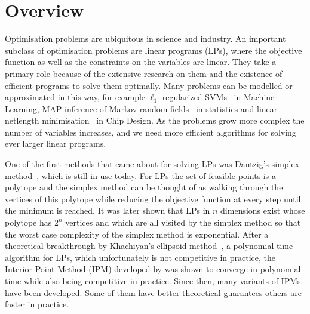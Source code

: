 \chapter{Overview}\label{chap:introduction}

Optimisation problems are ubiquitous in science and industry.
An important subclass of optimisation problems are linear programs (LPs), where the objective function as well as the constraints on the variables are linear.
They take a primary role because of the extensive research on them and the existence of efficient programs to solve them optimally.
Many problems can be modelled or approximated in this way, for example \(\ell_1\)-regularized SVMs~\cite{ZhuRossetTibshiraniHastie-1normSupportVectorMachines} in Machine Learning, MAP inference of Markov random fields~\cite{MeshiGloberson-MapLpRelaxation} in statistics and linear netlength minimisation~\cite{BrennerVygen-AnalyticalMethodsInVlsiPlacement} in Chip Design.
As the problems grow more complex the number of variables increases, and we need more efficient algorithms for solving ever larger linear programs.

One of the first methods that came about for solving LPs was Dantzig's simplex method~\cite{Dantzig-Simplex}, which is still in use today.
For LPs the set of feasible points is a polytope and the simplex method can be thought of as walking through the vertices of this polytope while reducing the objective function at every step until the minimum is reached.
It was later shown that LPs in \(n\) dimensions exist whose polytope has \(2^n\) vertices and which are all visited by the simplex method so that the worst case complexity of the simplex method is exponential.
After a theoretical breakthrough by Khachiyan's ellipsoid method~\cite{Khachiyan-Ellipsoid1,Khachiyan-Ellipsoid2}, a polynomial time algorithm for LPs, which unfortunately is not competitive in practice, the Interior-Point Method (IPM) developed by \textcite{Karmarkar-IPM} was shown to converge in polynomial time while also being competitive in practice.
Since then, many variants of IPMs have been developed.
Some of them have better theoretical guarantees others are faster in practice.

